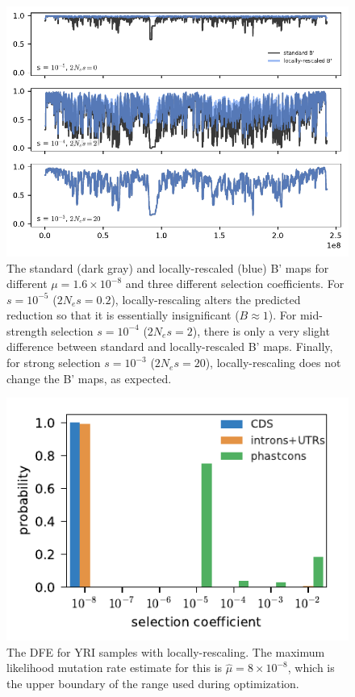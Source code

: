 \documentclass[11pt]{article}
\begin{document}
\begin{figure}[htbp]
    \label{suppfig:rescale-b}
  \centering
  \includegraphics[]{figures/supplementary/rescale_Bs.pdf}

  \caption{The standard (dark gray) and locally-rescaled (blue) B' maps for different
      $\mu = 1.6 \times 10^{-8}$ and three different selection coefficients.
      For $s=10^{-5}$ ($2N_e s = 0.2$), locally-rescaling alters the predicted
      reduction so that it is essentially insignificant ($B \approx 1$). For
  mid-strength selection $s=10^{-4}$ ($2N_e s = 2$), there is only a very
slight difference between standard and locally-rescaled B' maps. Finally, for
strong selection $s=10^{-3}$ ($2N_e s = 20$), locally-rescaling does not change
the B' maps, as expected. }
\end{figure}


\begin{figure}[htbp]
    \label{suppfig:rescale-dfe}
  \centering
  \includegraphics[]{figures/supplementary/rescale_DFE.pdf}

  \caption{The DFE for YRI samples with locally-rescaling. The maximum
  likelihood mutation rate estimate for this is $\widehat{\mu} = 8 \times
10^{-8}$, which is the upper boundary of the range used during optimization.}

\end{figure}
\end{document}

